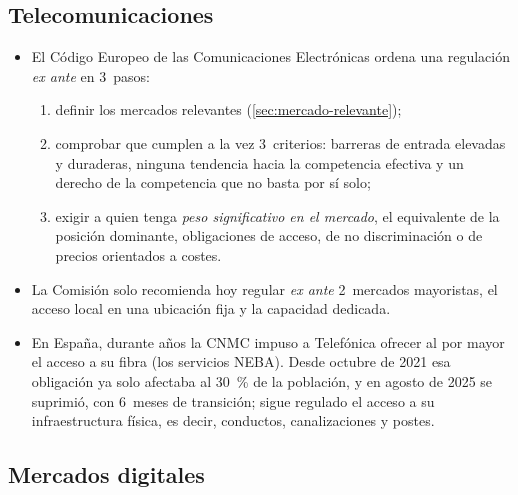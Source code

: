 \documentclass[11pt]{article}
\begin{document}
\subsection{Telecomunicaciones}\label{anexo:telecomunicaciones}

\begin{itemize}
\item El Código Europeo de las Comunicaciones Electrónicas ordena una regulación \emph{ex ante} en 3~pasos\nocite{UE2018CECE,Ley11_2022Telecomunicaciones}:
  \begin{enumerate}
  \item definir los mercados relevantes (\ref{sec:mercado-relevante});
  \item comprobar que cumplen a la vez 3~criterios: barreras de entrada elevadas y duraderas, ninguna tendencia hacia la competencia efectiva y un derecho de la competencia que no basta por sí solo;
  \item exigir a quien tenga \emph{peso significativo en el mercado}, el equivalente de la posición dominante, obligaciones de acceso, de no discriminación o de precios orientados a costes.
  \end{enumerate}
\item La Comisión solo recomienda hoy regular \emph{ex ante} 2~mercados mayoristas, el acceso local en una ubicación fija y la capacidad dedicada\nocite{UE2020RecomendacionMercados}.
\item En España, durante años la CNMC impuso a Telefónica ofrecer al por mayor el acceso a su fibra (los servicios NEBA). Desde octubre de 2021 esa obligación ya solo afectaba al 30~\% de la población, y en agosto de 2025 se suprimió, con 6~meses de transición; sigue regulado el acceso a su infraestructura física, es decir, conductos, canalizaciones y postes\nocite{CNMC2025Desregulacion}.
\end{itemize}

\subsection{Mercados digitales}\label{anexo:dma}
\end{document}
